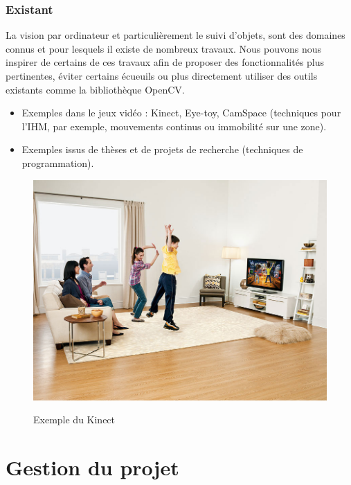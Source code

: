 \documentclass{report}
\begin{document}
		\subsubsection{Existant}
		La vision par ordinateur et particulièrement le suivi d'objets, sont des domaines connus et pour lesquels il existe de nombreux travaux. Nous pouvons nous inspirer de certains de ces travaux afin de proposer des fonctionnalités plus pertinentes, éviter certains écueuils ou plus directement utiliser des outils existants comme la bibliothèque OpenCV.\\
			\begin{itemize}
				\item Exemples dans le jeux vidéo : Kinect, Eye-toy, CamSpace (techniques pour l'IHM, par exemple, mouvements continus ou immobilité sur une zone).
				\item Exemples issus de thèses et de projets de recherche (techniques de programmation).
			\end{itemize}
			\begin{figure}[!h]
				\centering
				\includegraphics[scale=0.2]{../images/kinect_screen_lg.jpg}\\
				\caption{Exemple du Kinect}
				\label{Exemple du Kinect}
			\end{figure}
		\newpage
		\section{Gestion du projet}
\end{document}
